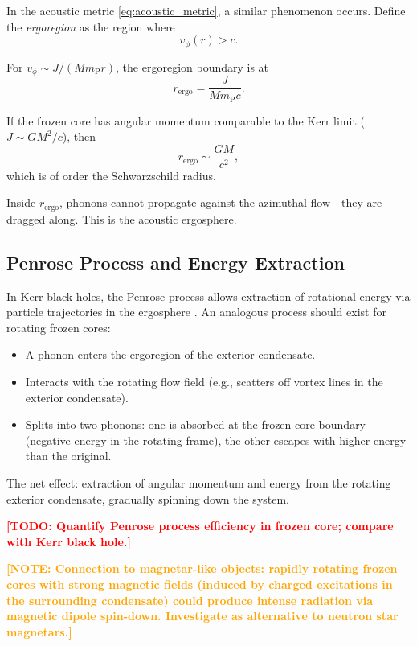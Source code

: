 \documentclass[12pt,a4paper]{article}
\newcommand{\TODO}[1]{\textcolor{red}{\textbf{[TODO: #1]}}}
\newcommand{\NOTE}[1]{\textcolor{orange}{\textbf{[NOTE: #1]}}}
\newcommand{\planckmass}{m_\text{P}}
\theoremstyle{definition}
\begin{document}
In the acoustic metric \eqref{eq:acoustic_metric}, a similar phenomenon occurs. Define the \emph{ergoregion} as the region where
\begin{equation}
v_\phi(r) > c.
\label{eq:ergoregion_condition}
\end{equation}

For $v_\phi \sim J/(M \planckmass r)$, the ergoregion boundary is at
\begin{equation}
r_\text{ergo} = \frac{J}{M \planckmass c}.
\label{eq:r_ergo}
\end{equation}

If the frozen core has angular momentum comparable to the Kerr limit ($J \sim GM^2/c$), then
\begin{equation}
r_\text{ergo} \sim \frac{GM}{c^2},
\label{eq:r_ergo_kerr}
\end{equation}
which is of order the Schwarzschild radius.

Inside $r_\text{ergo}$, phonons cannot propagate against the azimuthal flow—they are dragged along. This is the acoustic ergosphere.

\subsection{Penrose Process and Energy Extraction}
\label{subsec:penrose_process}

In Kerr black holes, the Penrose process allows extraction of rotational energy via particle trajectories in the ergosphere \cite{Penrose1969}. An analogous process should exist for rotating frozen cores:

\begin{itemize}
  \item A phonon enters the ergoregion of the exterior condensate.
  \item Interacts with the rotating flow field (e.g., scatters off vortex lines in the exterior condensate).
  \item Splits into two phonons: one is absorbed at the frozen core boundary (negative energy in the rotating frame), the other escapes with higher energy than the original.
\end{itemize}

The net effect: extraction of angular momentum and energy from the rotating exterior condensate, gradually spinning down the system.

\TODO{Quantify Penrose process efficiency in frozen core; compare with Kerr black hole.}

\NOTE{Connection to magnetar-like objects: rapidly rotating frozen cores with strong magnetic fields (induced by charged excitations in the surrounding condensate) could produce intense radiation via magnetic dipole spin-down. Investigate as alternative to neutron star magnetars.}
\end{document}
